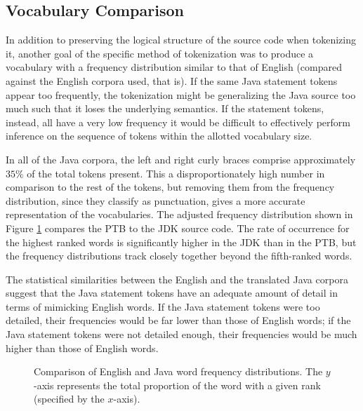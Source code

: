 \documentclass{article}
\begin{document}
\subsection{Vocabulary Comparison}

In addition to preserving the logical structure of the source code when
tokenizing it, another goal of the specific method of tokenization was to
produce a vocabulary with a frequency distribution similar to that of
English (compared against the English corpora used, that is). If the same
Java statement tokens appear too frequently, the tokenization might be
generalizing the Java source too much such that it loses the underlying
semantics. If the statement tokens, instead, all have a very low frequency
it would be difficult to effectively perform inference on the sequence of 
tokens within the allotted vocabulary size.

In all of the Java corpora, the left and right curly braces comprise
approximately $35\%$
of the total tokens present. This a disproportionately high number in
comparison to the rest of the tokens, but removing them from the frequency
distribution, since they classify as punctuation, gives a more accurate
representation of the vocabularies. The adjusted frequency distribution
shown in Figure \ref{english-frequency} compares the PTB to the
JDK source code. The rate of occurrence for the highest
ranked words is significantly higher in the JDK than in the PTB, but
the frequency distributions track closely together beyond the fifth-ranked
words.

The statistical similarities between the English and the translated Java
corpora suggest that the Java statement tokens have an adequate amount of
detail in terms of mimicking English words. If the Java statement tokens
were too detailed, their frequencies would be far lower than those of English
words; if the Java statement tokens were not detailed enough, their
frequencies would be much higher than those of English words.

\begin{figure}
\caption{Comparison of English and Java word frequency distributions.
    The $y$-axis represents the total proportion of the word with a given
    rank (specified by the $x$-axis).}
\label{english-frequency}
\end{figure}
 
\end{document}
